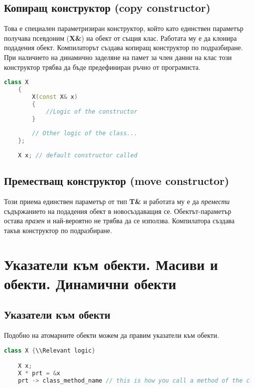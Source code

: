 \documentclass[fleqn,12pt]{article}
\begin{document}
\subsection{Копиращ конструктор (copy constructor)}
Това е специален параметризиран конструктор, който като единствен параметър получава псевдоним (\textbf{X\&}) на обект от същия клас.
Работата му е да клонира подадения обект. Компилаторът създава копиращ конструктор по подразбиране. При наличието на динамично заделяне на памет за член данни на клас този конструктор трябва да бъде предефиниран ръчно от програмиста.

\begin{lstlisting}[language=C++, caption=Copy constructor]
    class X
    {
        X(const X& x)
        {
            //Logic of the constructor
        }
    
        // Other logic of the class...
    };
    
    X x; // default constructor called
    \end{lstlisting}
    

\subsection{Преместващ конструктор (move constructor)}
Този приема единствен параметър от тип \textbf{T\&} и работата му е да \textit{премести} съдържанието на подадения обект 
в новосъздаващия се. Обектът-параметър остава \textit{празен} и най-вероятно не трябва да се използва.
Компилатора създава такъв конструктор по подразбиране.

\section{Указатели към обекти. Масиви и обекти. Динамични обекти}

\subsection{Указатели към обекти}
Подобно на атомарните обекти можем да правим указатели към обекти. 
\begin{lstlisting}[language=C++, caption=Example creation of pointers]
    class X {\\Relevant logic}

    X x;
    X * prt = &x
    prt -> class_method_name // this is how you call a method of the class through the pointer
\end{lstlisting}
\end{document}

